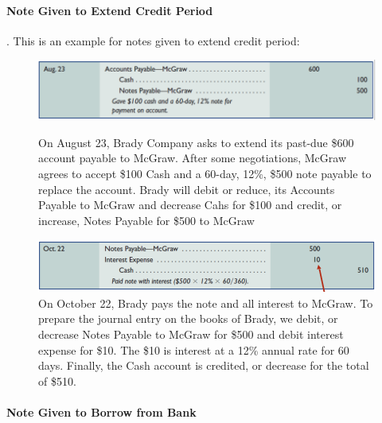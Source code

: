 \documentclass[../main.tex]{subfiles}
\begin{document}
	\paragraph{Note Given to Extend Credit Period}. This is an example for 
	notes given to extend credit period:
	\begin{figure}[ht]
		\centering
		\includegraphics[width=1\columnwidth]{images/c10_notes_payable1.png}
		\caption{On August 23, Brady Company asks to extend its past-due \$600 
			account payable to McGraw. After some negotiations, McGraw agrees 
			to accept 
			\$100 Cash and a 60-day, 12\%, \$500 note payable to replace the 
			account. 
			Brady will debit or reduce, its Accounts Payable to McGraw and 
			decrease 
			Cahs for \$100 and credit, or increase, Notes Payable for \$500 to 
			McGraw}
		\includegraphics[width=1\columnwidth]{images/c10_notes_payable2.png}
		\caption{On October 22, Brady pays the note and all interest to McGraw. 
		To 
			prepare the journal entry on the books of Brady, we debit, or 
			decrease 
			Notes Payable to McGraw for \$500 and debit interest expense for 
			\$10. The 
			\$10 is interest at a 12\% annual rate for 60 days. Finally, the 
			Cash 
			account is credited, or decrease for the total of \$510.}
	\end{figure}	
	
	\paragraph{Note Given to Borrow from Bank}
	
\end{document}
